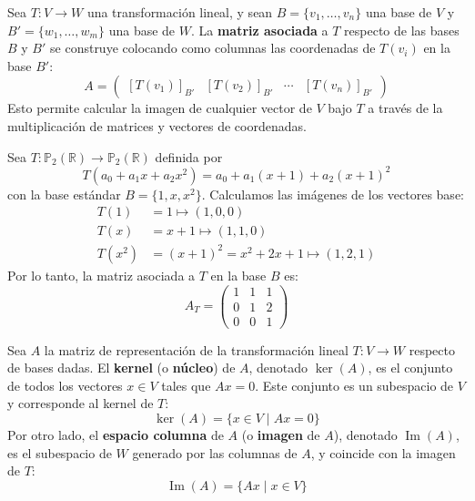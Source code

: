 \begin{rem}
Sea $T: V \to W$ una transformación lineal, y sean $B = \{v_1, \ldots, v_n\}$ una base de $V$ y $B' = \{w_1, \ldots, w_m\}$ una base de $W$. La \textbf{matriz asociada} a $T$ respecto de las bases $B$ y $B'$ se construye colocando como columnas las coordenadas de $T(v_i)$ en la base $B'$:
\[
A = \begin{pmatrix}
\left[ T(v_1) \right]_{B'} & \left[ T(v_2) \right]_{B'} & \cdots & \left[ T(v_n) \right]_{B'}
\end{pmatrix}
\]
Esto permite calcular la imagen de cualquier vector de $V$ bajo $T$ a través de la multiplicación de matrices y vectores de coordenadas.
\end{rem}

\begin{example}
Sea $T: \mathbb{P}_2(\mathbb{R}) \to \mathbb{P}_2(\mathbb{R})$ definida por
\[
T\left(a_0 + a_1 x + a_2 x^2\right) = a_0 + a_1(x+1) + a_2(x+1)^2
\]
con la base estándar $B = \{1, x, x^2\}$. Calculamos las imágenes de los vectores base:
\begin{align*}
T(1) &= 1 \mapsto (1, 0, 0) \\
T(x) &= x+1 \mapsto (1, 1, 0) \\
T(x^2) &= (x+1)^2 = x^2 + 2x + 1 \mapsto (1, 2, 1)
\end{align*}
Por lo tanto, la matriz asociada a $T$ en la base $B$ es:
\[
A_T = \begin{pmatrix}
1 & 1 & 1 \\
0 & 1 & 2 \\
0 & 0 & 1
\end{pmatrix}
\]
\end{example}




\begin{definition}
Sea $A$ la matriz de representación de la transformación lineal $T: V \to W$ respecto de bases dadas. El \textbf{kernel} (o \textbf{núcleo}) de $A$, denotado $\ker(A)$, es el conjunto de todos los vectores $x \in V$ tales que $Ax = 0$. Este conjunto es un subespacio de $V$ y corresponde al kernel de $T$:
\[
\ker(A) = \{ x \in V \mid Ax = 0 \}
\]
Por otro lado, el \textbf{espacio columna} de $A$ (o \textbf{imagen} de $A$), denotado $\operatorname{Im}(A)$, es el subespacio de $W$ generado por las columnas de $A$, y coincide con la imagen de $T$:
\[
\operatorname{Im}(A) = \{ Ax \mid x \in V \}
\]
\end{definition}

